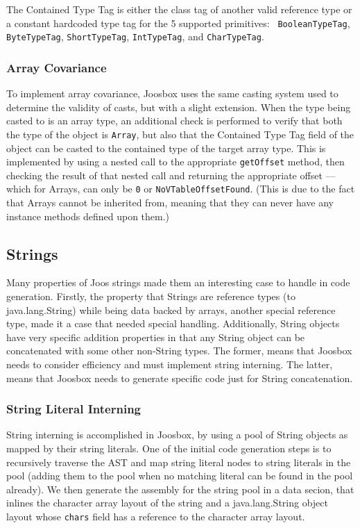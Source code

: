 \documentclass[letterpaper]{article}
\begin{document}
  The Contained Type Tag is either the class tag of another valid reference type
  or a constant hardcoded type tag for the 5 supported primitives: {\tt
  BooleanTypeTag}, {\tt ByteTypeTag}, {\tt ShortTypeTag}, {\tt IntTypeTag}, and
  {\tt CharTypeTag}.

  \subsubsection{Array Covariance}

  To implement array covariance, Joosbox uses the same casting system used to
  determine the validity of casts, but with a slight extension. When the type
  being casted to is an array type, an additional check is performed to verify
  that both the type of the object is {\tt Array}, but also that the Contained
  Type Tag field of the object can be casted to the contained type of the
  target array type. This is implemented by using a nested call to the
  appropriate {\tt getOffset} method, then checking the result of that nested
  call and returning the appropriate offset --- which for Arrays, can only be
  {\tt 0} or {\tt NoVTableOffsetFound}. (This is due to the fact that Arrays
  cannot be inherited from, meaning that they can never have any instance
  methods defined upon them.)

  \subsection{Strings}

  Many properties of Joos strings made them an interesting case to handle in
  code generation. Firstly, the property that Strings are reference types (to
  java.lang.String) while being data backed by arrays, another special reference
  type, made it a case that needed special handling. Additionally, String
  objects have very specific addition properties in that any String object can
  be concatenated with some other non-String types. The former, means that
  Joosbox needs to consider efficiency and must implement string interning. The
  latter, means that Joosbox needs to generate specific code just for String
  concatenation.

  \subsubsection{String Literal Interning}

  String interning is accomplished in Joosbox, by using a pool of String objects
  as mapped by their string literals. One of the initial code generation steps
  is to recursively traverse the AST and map string literal nodes to string
  literals in the pool (adding them to the pool when no matching literal can be
  found in the pool already). We then generate the assembly for the string pool
  in a data secion, that inlines the character array layout of the string and a
  java.lang.String object layout whose {\tt chars} field has a reference to the
  character array layout.
\end{document}
